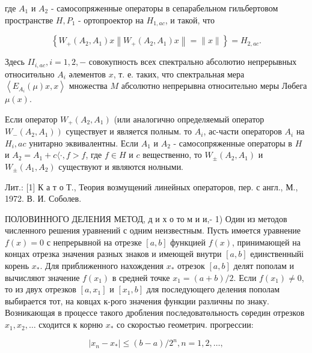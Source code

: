 \documentclass[10pt]{article}
\begin{document}
где $A_{1}$ и $A_{2}$ - самосопряженные операторы в сепарабельном гильбертовом пространстве $H, P_{1}$ - ортопроектор на $H_{1, a c}$, и такой, что



\[

\left\{W_{+}\left(A_{2}, A_{1}\right) x\left\|W_{+}\left(A_{2}, A_{1}\right) x\right\|=\|x\|\right\}=H_{2, a c} .

\]



Здесь $I I_{i, a c}, i=1,2,-$ совокупность всех спектрально абсолютио непрерывных относитөльно $A_{i}$ әлементов $x$, т. е. таких, что спектральная мера $\left\langle E_{A_{i}}(\mu) x, x\right\rangle$ множества $M$ абсолютно непрерывна относительно меры Лөбега $\mu(x)$.



Если оператор $W_{+}\left(A_{2}, A_{1}\right)$ (или аналогично определяемый оператор $\left.W_{-}\left(A_{2}, A_{1}\right)\right)$ существует и является полным. то $A_{i}$, ас-части операторов $A_{i}$ на $H_{i}, a c$ унитарно эквивалентны. Если $A_{1}$ и $A_{2}$ - самосопряженные операторы в $H$ и $A_{2}=A_{1}+c\langle\cdot, f>f$, где $f \in H$ и $c$ вещественно, то $W_{ \pm}\left(A_{2}, A_{1}\right)$ и $W_{ \pm}\left(A_{1}, A_{2}\right)$ существуют и являются нолными.



Лит.: [1] К а т о Т., Теория возмущений линейных операторов, пер. с англ., М., 1972. В. И. Соболев.



ПОЛОВИННОГО ДЕЛЕНИЯ МЕТОД, д и х о то м и и,- 1) Один из методов численного решения уравнений с одним неизвестным. Пусть имөется уравнение $f(x)=0$ с непрерывной на отрезке $[a, b]$ функцией $f(x)$, принимающей на концах отрезка значения разных знаков и имеющей внутри $[a, b]$ единственныйі корень $x_{*}$. Для приближенного нахождения $x_{*}$ отрезок $[a, b]$ делят пополам и вычисляют значение $f\left(x_{1}\right)$ в средней точке $x_{1}=(a+b) / 2$. Если $f\left(x_{1}\right) \neq 0$, то из двух отрезков $\left[a, x_{1}\right]$ и $\left[x_{1}, b\right]$ для последующего деления пополам выбирается тот, на ковцах к-рого значения функции различны по знаку. Возникающая в процессе такого дробления последоватөльность сөредин отрезков $x_{1}, x_{2}, \ldots$ сходится к корню $x_{*}$ со скоростью геометрич. прогрессии:



\[

\left|x_{n}-x_{*}\right| \leqslant(b-a) / 2^{n}, n=1,2, \ldots,

\]
\end{document}
